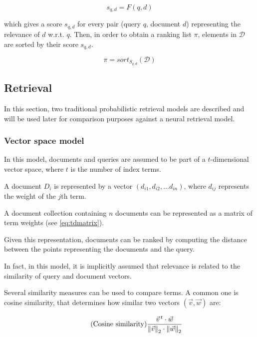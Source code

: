 \begin{equation}
\label{eq:f}
\tag{Ranking model}
s_{q, d} = F(q, d)
\end{equation}

which gives a score $s_{q, d}$ for every pair (query $q$, document $d$) representing the relevance of $d$ w.r.t. $q$. Then, in order to obtain a ranking list $\pi$, elements in $\mathcal{D}$ are sorted by their score $s_{q, d}$.

\begin{equation}
\tag{Ranking list}
\pi = sort_{S_{q,d}}(\mathcal{D})
\end{equation}

\subsection{Retrieval}

In this section, two traditional probabilistic retrieval models are described and will be used later for comparison purposes against a neural retrieval model.

\subsubsection{Vector space model}

In this model, documents and queries are assumed to be part of a $t$-dimensional vector space, where $t$ is the number of index terms.

A document $D_i$ is represented by a vector $(d_{i1}, d_{i2}, \dots d_{in})$, where $d_{ij}$ represents the weight of the $j$th term.

A document collection containing $n$ documents can be represented as a matrix of term weights (see \ref{eq:tdmatrix}). 

Given this representation, documents can be ranked by computing the distance between the points representing the documents and the query.

In fact, in this model, it is implicitly assumed that relevance is related to the similarity of query and document vectors.

Several similarity measures can be used to compare terms. A common one is cosine similarity, that determines how similar two vectors $(\vec{v}, \vec{w})$ are:

\begin{equation}
\tag{Cosine similarity}
\label{eq:cosine}
\frac{\vec{v}^{\,t} \cdot \vec{w}}{\left\lVert\vec{v}\right\rVert_2 \cdot \left\lVert\vec{w}\right\rVert_2}
\end{equation}

